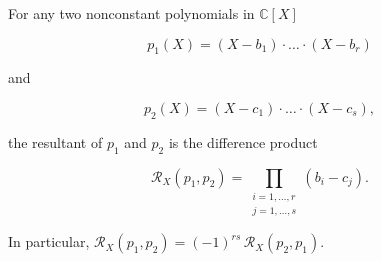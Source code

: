 For any two nonconstant polynomials in $\mathbb{C}[X]$

$$p_1(X) = (X - b_1) \cdot \ldots \cdot (X - b_r)$$

and

$$p_2(X) = (X - c_1) \cdot \ldots \cdot (X - c_s),$$

the resultant of $p_1$ and $p_2$ is the difference product

$$\mathcal{R}_X(p_1, p_2) = \prod_{\substack{i=1, \ldots, r \\ j=1, \ldots, s}} (b_i - c_j).$$

In particular, $\mathcal{R}_X(p_1, p_2) = (-1)^{rs}\,\mathcal{R}_X(p_2, p_1)$.
